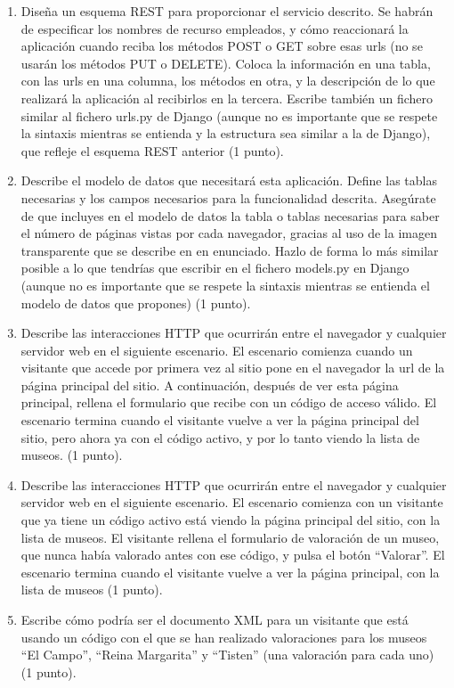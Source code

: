 \begin{enumerate}
\item Diseña un esquema REST para proporcionar el servicio descrito. Se habrán de especificar los nombres de recurso empleados, y cómo reaccionará la aplicación cuando reciba los métodos POST o GET sobre esas urls (no se usarán los métodos PUT o DELETE). Coloca la información en una tabla, con las urls en una columna, los métodos en otra, y la descripción de lo que realizará la aplicación al recibirlos en la tercera. Escribe también un fichero similar al fichero urls.py de Django (aunque no es importante que se respete la sintaxis mientras se entienda y la estructura sea similar a la de Django), que refleje el esquema REST anterior (1 punto).

\item Describe el modelo de datos que necesitará esta aplicación. Define las tablas necesarias y los campos necesarios para la funcionalidad descrita. Asegúrate de que incluyes en el modelo de datos la tabla o tablas necesarias para saber el número de páginas vistas por cada navegador, gracias al uso de la imagen transparente que se describe en en enunciado. Hazlo de forma lo más similar posible a lo que tendrías que escribir en el fichero models.py en Django (aunque no es importante que se respete la sintaxis mientras se entienda el modelo de datos que propones) (1 punto).

\item Describe las interacciones HTTP que ocurrirán entre el navegador y cualquier servidor web en el siguiente escenario. El escenario comienza cuando un visitante que accede por primera vez al sitio pone en el navegador la url de la página principal del sitio. A continuación, después de ver esta página principal, rellena el formulario que recibe con un código de acceso válido. El escenario termina cuando el visitante vuelve a ver la página principal del sitio, pero ahora ya con el código activo, y por lo tanto viendo la lista de museos. (1 punto).

\item Describe las interacciones HTTP que ocurrirán entre el navegador y cualquier servidor web en el siguiente escenario. El escenario comienza con un visitante que ya tiene un código activo está viendo la página principal del sitio, con la lista de museos. El visitante rellena el formulario de valoración de un museo, que nunca había valorado antes con ese código, y pulsa el botón ``Valorar''. El escenario termina cuando el visitante vuelve a ver la página principal, con la lista de museos (1 punto).

\item Escribe cómo podría ser el documento XML para un visitante que está usando un código con el que se han realizado valoraciones para los museos ``El Campo'', ``Reina Margarita'' y ``Tisten'' (una valoración para cada uno) (1 punto).
\end{enumerate}

